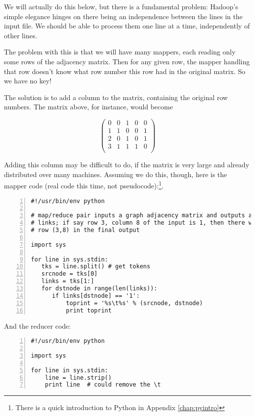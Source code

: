 We will actually do this below, but there is a fundamental problem:
Hadoop's simple elegance hinges on there being an independence between
the lines in the input file.  We should be able to process them one line
at a time, independently of other lines.

The problem with this is that we will have many mappers, each reading
only some rows of the adjacency matrix.  Then for any given row, the
mapper handling that row doesn't know what row number this row had in
the original matrix.  So we have no key!

The solution is to add a column to the matrix, containing the original
row numbers.  The matrix above, for instance, would become

\begin{equation}
\left (
\begin{array}{rrrrr}
0 & 0 & 1 & 0 & 0 \\
1 & 1 & 0 & 0 & 1 \\
2 & 0 & 1 & 0 & 1 \\
3 & 1 & 1 & 1 & 0 \\
\end{array}
\right )
\end{equation}

Adding this column may be difficult to do, if the matrix is very large
and already distributed over many machines.  Assuming we do this,
though, here is the mapper code (real code this time, not
pseudocode):\footnote{There is a quick introduction to Python in
Appendix \ref{chap:pyintro}}.

\begin{lstlisting}[numbers=left]
#!/usr/bin/env python

# map/reduce pair inputs a graph adjacency matrix and outputs a list of
# links; if say row 3, column 8 of the input is 1, then there will be a
# row (3,8) in the final output
 
import sys

for line in sys.stdin:
   tks = line.split() # get tokens
   srcnode = tks[0]
   links = tks[1:]
   for dstnode in range(len(links)):
      if links[dstnode] == '1':
          toprint = '%s\t%s' % (srcnode, dstnode) 
          print toprint
\end{lstlisting}

And the reducer code:

\begin{lstlisting}[numbers=left]
#!/usr/bin/env python

import sys

for line in sys.stdin:
    line = line.strip()
    print line  # could remove the \t
\end{lstlisting}

